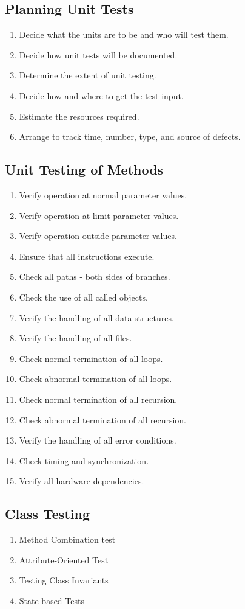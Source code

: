 \documentclass{report}
\begin{document}
			\subsection{Planning Unit Tests}
				\begin{enumerate}
					\item Decide what the units are to be and who will test them.
					\item Decide how unit tests will be documented.
					\item Determine the extent of unit testing.
					\item Decide how and where to get the test input.
					\item Estimate the resources required.
					\item Arrange to track time, number, type, and source of defects.
				\end{enumerate}
			\subsection{Unit Testing of Methods}
				\begin{enumerate}
					\item Verify operation at normal parameter values.
					\item Verify operation at limit parameter values.
					\item Verify operation outside parameter values.
					\item Ensure that all instructions execute.
					\item Check all paths - both sides of branches.
					\item Check the use of all called objects.
					\item Verify the handling of all data structures.
					\item Verify the handling of all files.
					\item Check normal termination of all loops.
					\item Check abnormal termination of all loops.
					\item Check normal termination of all recursion.
					\item Check abnormal termination of all recursion.
					\item Verify the handling of all error conditions.
					\item Check timing and synchronization.
					\item Verify all hardware dependencies.
				\end{enumerate}
			\subsection{Class Testing}
				\begin{enumerate}
					\item Method Combination test
					\item Attribute-Oriented Test
					\item Testing Class Invariants
					\item State-based Tests
				\end{enumerate}
\end{document}
